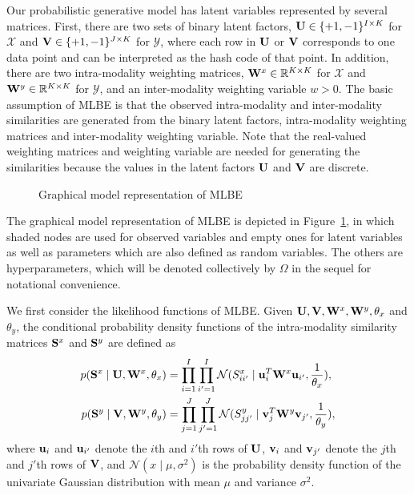 Our probabilistic generative model has latent variables represented by several matrices.  First, there are two sets of binary latent factors, $\U \in \{+1,-1\}^{I\times K}$ for $\mathcal{X}$ and $\V \in \{+1,-1\}^{J \times K}$ for $\mathcal{Y}$, where each row in $\U$ or $\V$ corresponds to one data point and can be interpreted as the hash code of that point.  In addition, there are two intra-modality weighting matrices, $\W^{x} \in \mathbb{R}^{K\times K}$ for $\mathcal{X}$ and $\W^{y} \in \mathbb{R}^{K\times K}$ for $\mathcal{Y}$, and an inter-modality weighting variable $w>0$.  The basic assumption of \mbox{MLBE} is that the observed intra-modality and inter-modality similarities are generated from the binary latent factors, intra-modality weighting matrices and inter-modality weighting variable.  Note that the real-valued weighting matrices and weighting variable are needed for generating the similarities because the values in the latent factors $\U$ and $\V$ are discrete.

\begin{figure}[t]
\centering
{}
\caption{Graphical model representation of \mbox{MLBE}}
\label{mlbe:fig:model}
\end{figure}

The graphical model representation of \mbox{MLBE} is depicted in Figure~\ref{mlbe:fig:model}, in which shaded nodes are used for observed variables and empty ones for latent variables as well as parameters which are also defined as random variables.  The others are hyperparameters, which will be denoted collectively by $\Omega$ in the sequel for notational convenience.

We first consider the likelihood functions of \mbox{MLBE}. Given $\U, \V, \W^{x}, \W^{y}, \theta_{x}$ and $\theta_{y}$, the conditional probability density functions of the intra-modality similarity matrices $\S^{x}$ and $\S^{y}$ are defined as
\begin{align}
p(\S^{x} \mid \U, \W^{x},\theta_{x}) &= \prod\limits_{i=1}^{I}\prod\limits_{i'=1}^{I} \mathcal{N}(S^{x}_{ii'}\mid \u_i^T\W^{x}\u_{i'},\frac{1}{\theta_x} ),\nonumber\\
p(\S^{y} \mid \V, \W^{y}, \theta_y) &=  \prod\limits_{j=1}^{J}\prod\limits_{j'=1}^{J} \mathcal{N}(S^{y}_{jj'}\mid \v_j^T\W^{y}\v_{j'},\frac{1}{\theta_y} ), \nonumber
\end{align}
where $ \u_i $ and $ \u_{i'} $ denote the $ i $th and $ i' $th rows of $ \U  $, $ \v_i $ and $ \v_{j'} $ denote the $ j $th and $ j' $th rows of $ \V  $, and $\mathcal{N}(x\mid \mu, \sigma^2)$ is the probability density function of the univariate Gaussian distribution with mean $\mu $ and variance $\sigma^2$.


